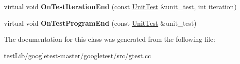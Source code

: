 \begin{DoxyCompactItemize}
\item 
\mbox{\label{classtesting_1_1internal_1_1TestEventRepeater_a94253e3c11753328e8a031f39352708f}} 
virtual void {\bfseries On\+Test\+Iteration\+End} (const \hyperlink{classtesting_1_1UnitTest}{Unit\+Test} \&unit\+\_\+test, int iteration)
\item 
\mbox{\label{classtesting_1_1internal_1_1TestEventRepeater_a4622616259747dbcc23f5ee39ef99ec0}} 
virtual void {\bfseries On\+Test\+Program\+End} (const \hyperlink{classtesting_1_1UnitTest}{Unit\+Test} \&unit\+\_\+test)
\end{DoxyCompactItemize}


The documentation for this class was generated from the following file\+:\begin{DoxyCompactItemize}
\item 
test\+Lib/googletest-\/master/googletest/src/gtest.\+cc\end{DoxyCompactItemize}
